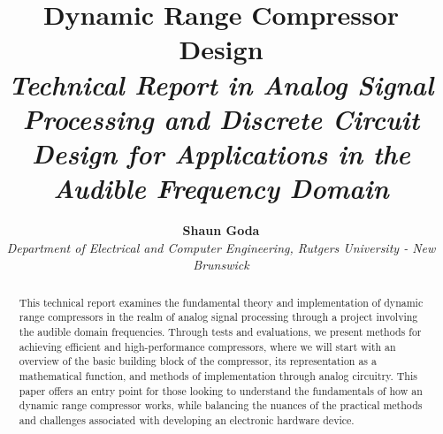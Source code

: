 \documentclass[10pt]{article}
\begin{document}
    \pagestyle{fancy}
    \fancyhf{}
    \renewcommand{\headrulewidth}{0pt}
    \fancypagestyle{firstpage}{
        \fancyhf{}
        \fancyfoot[C]{\footnotesize Page \thepage\ of \pageref{LastPage}}
        \renewcommand{\headrulewidth}{0pt}
    }

    \title{
        \vspace{-5ex}
        \textbf{\huge Dynamic Range Compressor Design}\\
        \textit{Technical Report in Analog Signal Processing and Discrete Circuit Design for Applications in the Audible Frequency Domain}
    }

    \author{
        \textbf{\Large Shaun Goda}\\
        \textit{\normalsize Department of Electrical and Computer Engineering, Rutgers University - New Brunswick}
    }

    \date{\vspace{-5ex}} %

    \maketitle

    \thispagestyle{firstpage}

    \begin{abstract}
        This technical report examines the fundamental theory and implementation of dynamic range compressors in the realm of analog signal processing through a project involving the audible domain frequencies. Through tests and evaluations, we present methods for achieving efficient and high-performance compressors, where we will start with an overview of the basic building block of the compressor, its representation as a mathematical function, and methods of implementation through analog circuitry. This paper offers an entry point for those looking to understand the fundamentals of how an dynamic range compressor works, while balancing the nuances of the practical methods and challenges associated with developing an electronic hardware device.
    \end{abstract}
    
\end{document}
